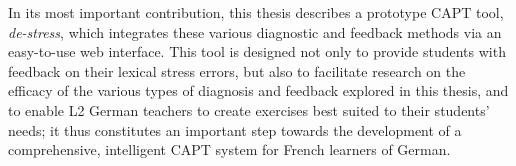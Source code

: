 In its most important contribution, this thesis describes a prototype CAPT tool, \textit{de-stress},
which integrates these various diagnostic and feedback methods via an easy-to-use web interface. 
This tool is designed not only to provide students with feedback on their lexical stress errors, but also to facilitate research on the efficacy of the various
 types of diagnosis and feedback
 explored in this thesis, and to enable L2 German teachers 
 to create exercises best suited to their students' needs; it thus constitutes an important step towards the development of a comprehensive, intelligent CAPT system for French learners of German. 




%
